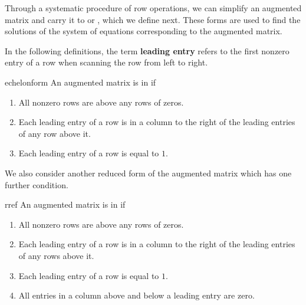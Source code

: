 Through a systematic
procedure of row operations, we can simplify an augmented matrix and carry it to \textbf{\ef} or \textbf{\rref}, which we define next. These 
forms are used to find the solutions of the system of equations corresponding to the augmented matrix.

In the following definitions, the term
\textbf{leading entry}
refers to
 the first nonzero entry of a row when scanning the row
from left to right.

\begin{definition}{\EF}{echelonform}
An augmented matrix is
\index{\ef} in \textbf{\ef} if

\begin{enumerate}
\item All nonzero rows are above any rows of zeros.

\item Each leading entry of a row is in a column to the right of the leading entries of any row above it. 


\item Each leading entry of a row is equal to $1$.

\end{enumerate}
\end{definition}

We also consider another reduced form of the augmented matrix which has one further condition. 


\begin{definition}{\RREF}{rref}
An augmented 
\index{\rref} matrix is in \textbf{\rref } if

\begin{enumerate}
\item All nonzero rows are above any rows of zeros.

\item Each leading entry of a row is in a column to the right of the leading
entries of any rows above it.

\item Each leading entry of a row is equal to $1$.

\item All entries in a column above and below a leading entry are zero.

\end{enumerate}
\end{definition}


